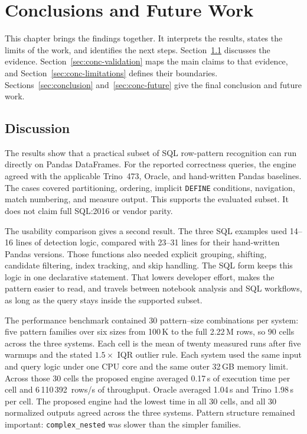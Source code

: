 \chapter{Conclusions and Future Work}
\label{chap:conclusions}

This chapter brings the findings together.  It interprets the results,
states the limits of the work, and identifies the next steps.
Section~\ref{sec:discussion} discusses the evidence.
Section~\ref{sec:conc-validation} maps the main claims to that evidence,
and Section~\ref{sec:conc-limitations} defines their boundaries.
Sections~\ref{sec:conclusion} and~\ref{sec:conc-future} give the final
conclusion and future work.

\section{Discussion}
\label{sec:discussion}

The results show that a practical subset of SQL row-pattern recognition
can run directly on Pandas DataFrames.  For the reported
correctness queries, the engine agreed with the applicable Trino~473,
Oracle, and hand-written Pandas baselines.
The cases covered partitioning, ordering, implicit \texttt{DEFINE}
conditions, navigation, match numbering, and measure output.  This
supports the evaluated subset.  It does not claim full SQL:2016 or
vendor parity.

The usability comparison gives a second result.  The three SQL examples
used 14--16 lines of detection logic, compared with 23--31 lines for
their hand-written Pandas versions.  Those functions also needed
explicit grouping, shifting, candidate filtering, index tracking, and
skip handling.  The SQL form keeps this logic in one declarative
statement.  That lowers developer effort, makes the pattern easier to
read, and travels between notebook analysis and SQL workflows, as long
as the query stays inside the supported subset.

The performance benchmark contained 30 pattern--size
combinations per system: five pattern families over six sizes from
100\,K to the full 2.22\,M rows, so 90 cells across the three systems.
Each cell is the mean of twenty measured runs after
five warmups and the stated $1.5\times$ IQR outlier rule.  Each system
used the same input and query logic under one CPU core and the same outer 32\,GB
memory limit.  Across those 30 cells the
proposed engine averaged 0.17\,s of execution time per cell and
6\,110\,392~rows/s of throughput.  Oracle averaged 1.04\,s and
Trino 1.98\,s per cell.  The proposed engine had the lowest time in all 30
cells, and all 30 normalized outputs agreed across the three systems.
Pattern structure remained important:
\texttt{complex\_nested} was slower than the simpler families.

